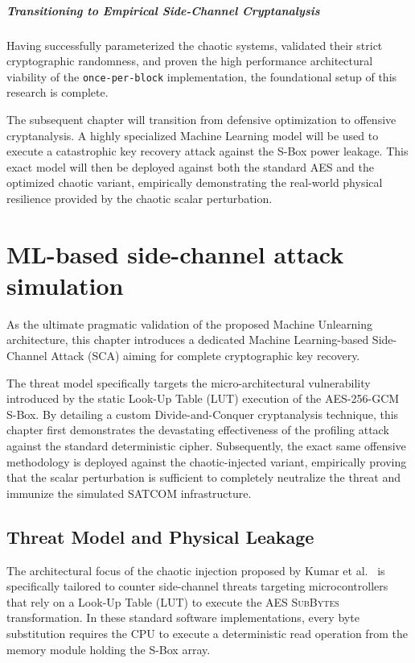\documentclass[11pt,a4paper]{report}
\begin{document}
\paragraph{Transitioning to Empirical Side-Channel Cryptanalysis}
Having successfully parameterized the chaotic systems, validated their strict cryptographic randomness, and proven the high performance architectural viability of the \texttt{once-per-block} implementation, 
the foundational setup of this research is complete. 

The subsequent chapter will transition from defensive optimization to offensive cryptanalysis. 
A highly specialized Machine Learning model will be used to execute a catastrophic key recovery attack against the S-Box power leakage. 
This exact model will then be deployed against both the standard AES and the optimized chaotic variant, 
empirically demonstrating the real-world physical resilience provided by the chaotic scalar perturbation.





\chapter[ML-based side-channel attack simulation]{ML-based side-channel attack \\ simulation}

As the ultimate pragmatic validation of the proposed Machine Unlearning architecture, this chapter introduces a dedicated Machine Learning-based Side-Channel Attack (SCA) 
aiming for complete cryptographic key recovery. 

The threat model specifically targets the micro-architectural vulnerability introduced by the static Look-Up Table (LUT) execution of the AES-256-GCM S-Box. 
By detailing a custom Divide-and-Conquer cryptanalysis technique, this chapter first demonstrates the devastating effectiveness of the profiling attack against the standard deterministic cipher. 
Subsequently, the exact same offensive methodology is deployed against the chaotic-injected variant, empirically proving that the scalar perturbation is sufficient to completely neutralize the threat and immunize the simulated SATCOM infrastructure.

\section{Threat Model and Physical Leakage}
The architectural focus of the chaotic injection proposed by Kumar et al.~\cite{KumarPaper} is specifically tailored to counter side-channel threats targeting microcontrollers that rely on a Look-Up Table (LUT) to execute the AES \textsc{SubBytes} transformation. 
In these standard software implementations, every byte substitution requires the CPU to execute a deterministic read operation from the memory module holding the S-Box array.
\end{document}
